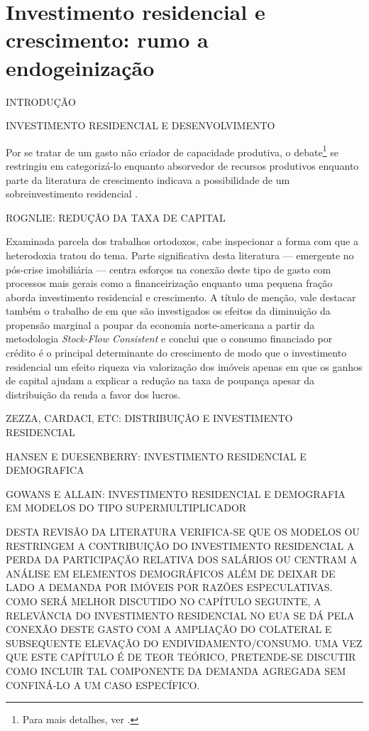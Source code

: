 \section{Investimento residencial e crescimento: rumo a endogeinização}


INTRODUÇÃO

INVESTIMENTO RESIDENCIAL E DESENVOLVIMENTO

Por se tratar de um gasto não criador de capacidade produtiva, o debate\footnote{Para mais detalhes, ver \textcite{arku_housing_2006}.} se restringiu em categorizá-lo enquanto absorvedor de recursos produtivos \cite{solow_importance_1995} enquanto parte da literatura de crescimento indicava  a possibilidade de um sobreinvestimento residencial \cite{mills_has_1987}.

ROGNLIE: REDUÇÃO DA TAXA DE CAPITAL

Examinada parcela dos trabalhos ortodoxos, cabe inspecionar a forma com que a heterodoxia tratou do tema. 
Parte significativa desta literatura  --- emergente no pós-crise imobiliária --- centra esforços na conexão deste tipo de gasto com processos mais gerais como a financeirização \cites{aalbers_financialization_2008}{bibow_financialization_2010} enquanto uma pequena fração aborda investimento residencial e crescimento.
A título de menção, vale destacar também o trabalho de \textcite{zezza_u.s._2008} em que são investigados os efeitos da diminuição da propensão marginal a poupar da economia norte-americana a partir da metodologia \textit{Stock-Flow Consistent} e conclui que o consumo financiado por crédito é o principal determinante do crescimento de modo que o investimento residencial um efeito riqueza via valorização dos imóveis apenas em que os ganhos de capital ajudam a explicar a redução na taxa de poupança apesar da distribuição da renda a favor dos lucros. 


ZEZZA, CARDACI, ETC: DISTRIBUIÇÃO E INVESTIMENTO RESIDENCIAL

HANSEN E DUESENBERRY: INVESTIMENTO RESIDENCIAL E DEMOGRAFICA

GOWANS E ALLAIN: INVESTIMENTO RESIDENCIAL E DEMOGRAFIA EM MODELOS DO TIPO SUPERMULTIPLICADOR

DESTA REVISÃO DA LITERATURA VERIFICA-SE QUE OS MODELOS OU RESTRINGEM A CONTRIBUIÇÃO DO INVESTIMENTO RESIDENCIAL A PERDA DA PARTICIPAÇÃO RELATIVA DOS SALÁRIOS OU CENTRAM A ANÁLISE EM ELEMENTOS DEMOGRÁFICOS ALÉM DE DEIXAR DE LADO A DEMANDA POR IMÓVEIS POR RAZÕES ESPECULATIVAS. COMO SERÁ MELHOR DISCUTIDO NO CAPÍTULO SEGUINTE, A RELEVÂNCIA DO INVESTIMENTO RESIDENCIAL NO EUA SE DÁ PELA CONEXÃO DESTE GASTO COM A AMPLIAÇÃO DO COLATERAL E SUBSEQUENTE ELEVAÇÃO DO ENDIVIDAMENTO/CONSUMO. UMA VEZ QUE ESTE CAPÍTULO É DE TEOR TEÓRICO, PRETENDE-SE DISCUTIR COMO INCLUIR TAL COMPONENTE DA DEMANDA AGREGADA SEM CONFINÁ-LO A UM CASO ESPECÍFICO.

